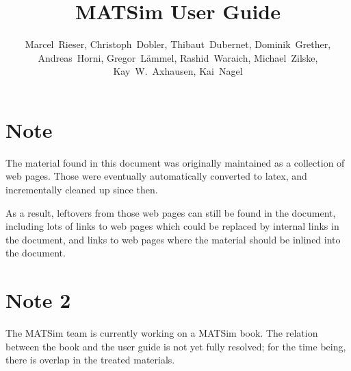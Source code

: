 \documentclass[a4paper,11pt]{report}
\newcommand{\NextFile}[1]{}
\def\umbruch{\vfill\eject}
\def\umbruch{\relax}
\begin{document}
\NextFile{index.html}

\title{MATSim User Guide}

\author{%
Marcel~Rieser, %
%
Christoph~Dobler,
Thibaut~Dubernet,
Dominik~Grether,
Andreas~Horni, 
Gregor~Lämmel,
Rashid~Waraich,
Michael~Zilske,
%
Kay~W.~Axhausen, %
Kai~Nagel %
}



\umbruch

\section*{Note}

The material found in this document was originally maintained as a collection of web pages.  Those were eventually automatically converted to latex, and incrementally cleaned up since then.  

As a result, leftovers from those web pages can still be found in the document, including lots of links to web pages which could be replaced by internal links in the document, and links to web pages where the material should be inlined into the document.




\section*{Note 2}

The MATSim team is currently working on a MATSim book.  The relation between the book and the user guide is not yet fully resolved; for the time being, there is overlap in the treated materials.




\umbruch

\tableofcontents

\end{document}
